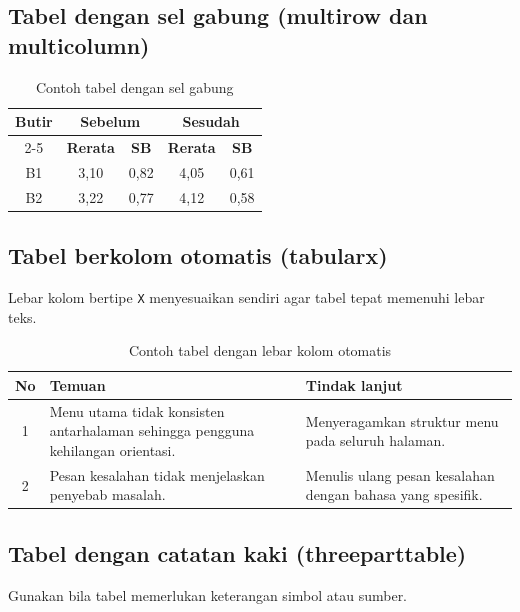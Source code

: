 \subsection{Tabel dengan sel gabung (multirow dan multicolumn)}

\begin{table}[H]
    \centering
    \caption{Contoh tabel dengan sel gabung}
    \label{tab:g-gabung}
    \begin{tabular}{|c|c|c|c|c|}
        \hline
        \multirow{2}{*}{\textbf{Butir}} & \multicolumn{2}{c|}{\textbf{Sebelum}} & \multicolumn{2}{c|}{\textbf{Sesudah}} \\ \cline{2-5}
         & \textbf{Rerata} & \textbf{SB} & \textbf{Rerata} & \textbf{SB} \\ \hline
        B1 & 3,10 & 0,82 & 4,05 & 0,61 \\ \hline
        B2 & 3,22 & 0,77 & 4,12 & 0,58 \\ \hline
    \end{tabular}
\end{table}

\subsection{Tabel berkolom otomatis (tabularx)}
Lebar kolom bertipe \texttt{X} menyesuaikan sendiri agar tabel tepat memenuhi
lebar teks.

\begin{table}[H]
    \centering
    \caption{Contoh tabel dengan lebar kolom otomatis}
    \label{tab:g-tabularx}
    \begin{tabularx}{\textwidth}{|c|X|X|}
        \hline
        \textbf{No} & \textbf{Temuan} & \textbf{Tindak lanjut} \\ \hline
        1 & Menu utama tidak konsisten antarhalaman sehingga pengguna kehilangan orientasi. & Menyeragamkan struktur menu pada seluruh halaman. \\ \hline
        2 & Pesan kesalahan tidak menjelaskan penyebab masalah. & Menulis ulang pesan kesalahan dengan bahasa yang spesifik. \\ \hline
    \end{tabularx}
\end{table}

\subsection{Tabel dengan catatan kaki (threeparttable)}
Gunakan bila tabel memerlukan keterangan simbol atau sumber.

